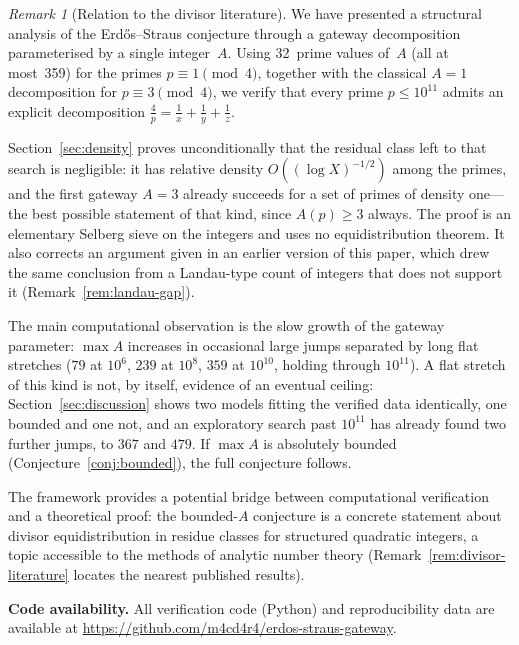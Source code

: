 \documentclass[12pt]{amsart}
\theoremstyle{definition}
\theoremstyle{remark}
\newtheorem{remark}[theorem]{Remark}
\begin{document}
\begin{remark}[Relation to the divisor literature]
We have presented a structural analysis of the Erd\H{o}s--Straus conjecture
through a gateway decomposition parameterised by a single integer~$A$.
Using 32~prime values of~$A$ (all at most~359) for the primes
$p \equiv 1 \pmod 4$, together with the classical $A = 1$ decomposition
for $p \equiv 3 \pmod 4$, we verify that every
prime $p \leq 10^{11}$ admits an explicit decomposition
$\frac{4}{p} = \frac{1}{x} + \frac{1}{y} + \frac{1}{z}$.

Section~\ref{sec:density} proves unconditionally that the residual
class left to that search is negligible: it has relative density
$O((\log X)^{-1/2})$ among the primes, and the first gateway $A = 3$
already succeeds for a set of primes of density one---the best possible
statement of that kind, since $A(p) \geq 3$ always.  The proof is an
elementary Selberg sieve on the integers and uses no equidistribution
theorem.  It also corrects an argument given in an earlier version of
this paper, which drew the same conclusion from a Landau-type count of
integers that does not support it (Remark~\ref{rem:landau-gap}).

The main computational observation is the slow growth of the gateway
parameter: $\max A$ increases in occasional large jumps separated by
long flat stretches ($79$ at $10^6$, $239$ at $10^8$, $359$ at
$10^{10}$, holding through $10^{11}$).
A flat stretch of this kind is not, by itself, evidence of an eventual
ceiling: Section~\ref{sec:discussion} shows two models fitting the
verified data identically, one bounded and one not, and an exploratory
search past $10^{11}$ has already found two further jumps, to $367$
and $479$. If $\max A$ is absolutely bounded
(Conjecture~\ref{conj:bounded}), the full conjecture follows.

The framework provides a potential bridge between computational verification
and a theoretical proof: the bounded-$A$ conjecture is a concrete
statement about divisor equidistribution in residue classes for structured
quadratic integers, a topic accessible to the methods of analytic number theory
(Remark~\ref{rem:divisor-literature} locates the nearest published results).

\bigskip
\noindent\textbf{Code availability.}
All verification code (Python) and reproducibility data are available at
\url{https://github.com/m4cd4r4/erdos-straus-gateway}.




\end{remark}
\end{document}
